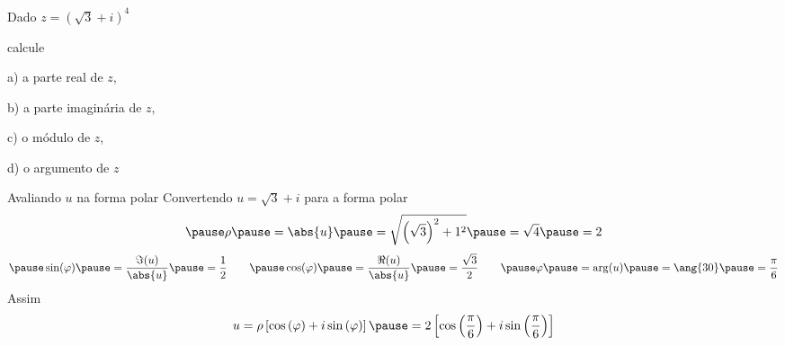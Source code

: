 \begin{question}
  Dado \(z=\left(\sqrt{3}+i\right)^4 \)

  calcule

  a) a parte real de $z$,

  b) a parte imaginária de $z$,

  c) o módulo de $z$,

  d) o argumento de $z$
\end{question}

\begin{resolution}{Avaliando $u$ na forma polar}
  Convertendo $u=\sqrt{3}+i$ para a forma polar
  \[
    \pause
    \rho
    \pause
    = \abs{u}
    \pause
    = \sqrt{\left(\sqrt{3}\right)^2 + 1^2}
    \pause
    = \sqrt{4}
    \pause
    = 2
  \]
  \[
    \pause
    \sin(\varphi)
    \pause
    = \frac{\Im(u)}{\abs{u}}
    \pause
    = \frac{1}{2}
    \qquad
    \pause
    \cos(\varphi)
    \pause
    = \frac{\Re(u)}{\abs{u}}
    \pause
    = \frac{\sqrt{3}}{2}
    \qquad
    \pause
    \varphi
    \pause
    = \arg(u)
    \pause
    = \ang{30}
    \pause
    = \frac{\pi}{6}
  \]
  \pause
  Assim
  \[
    u
    = \rho\left[\cos\left(\varphi\right)+ i\sin\left(\varphi\right)\right]
    \pause
    = 2\left[\cos\left(\frac{\pi}{6}\right)+ i\sin\left(\frac{\pi}{6}\right)\right]
  \]
\end{resolution}




